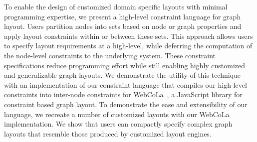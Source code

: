 

To enable the design of customized domain specific layouts with minimal programming expertise, we present a high-level constraint language for graph layout. Users partition nodes into sets based on node or graph properties and apply layout constraints within or between these sets. This approach allows users to specify layout requirements at a high-level, while deferring the computation of the node-level constraints to the underlying system. These constraint specifications reduce programming effort while still enabling highly customized and generalizable graph layouts. We demonstrate the utility of this technique with an implementation of our constraint language that compiles our high-level constraints into inter-node constraints for WebCoLa~\cite{WebCoLa}, a JavaScript library for constraint based graph layout. To demonstrate the ease and extensibility of our language, we recreate a number of customized layouts with our WebCoLa implementation. We show that users can compactly specify complex graph layouts that resemble those produced by customized layout engines.
